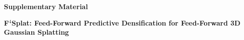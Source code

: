 \clearpage
\appendix
\setcounter{section}{0}
\renewcommand{\thesection}{S\arabic{section}}

\begin{center}
    {\LARGE \bfseries Supplementary Material \par}
    \vspace{0.5em}
    {\large \bfseries F$^4$Splat: Feed-Forward Predictive Densification for Feed-Forward 3D Gaussian Splatting\par}
\end{center}

\vspace{1em}


\setcounter{page}{1}
\setcounter{table}{0}
\renewcommand{\thetable}{S\arabic{table}}
\setcounter{figure}{0}
\renewcommand{\thefigure}{S\arabic{figure}}

% 




\newpage

\clearpage


\newpage
% 
% 

% 